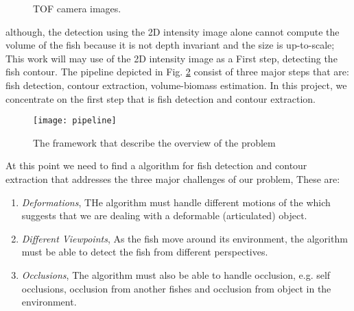 \begin{figure}[h]
\centering
{}

%
\caption{TOF camera images.}
\label{fig:tofNoisy}
\end{figure}

although, the detection using the 2D intensity image alone cannot compute the volume
of the fish because it is not depth invariant and the size is up-to-scale; This work 
will may use of the 2D intensity image as a First step, detecting the fish contour.
The pipeline depicted in Fig. \ref{fig:pipeline} consist of three major steps
that are: fish detection, contour extraction, volume-biomass estimation. In this 
project, we concentrate on the first step that is fish detection and contour extraction.

\begin{figure}[h]
\centering
\texttt{[image: pipeline]}
\caption{The framework that describe the overview of the problem}
\label{fig:pipeline}
\end{figure}

At this point we need to find a algorithm for fish detection and contour extraction 
that addresses the three major challenges of our problem, These are:

\begin{enumerate}
\item \textit{Deformations}, THe algorithm must handle different motions of the
which suggests that we are dealing with a deformable (articulated) object.
\item \textit{Different Viewpoints}, As the fish move around its environment, the 
algorithm must be able to detect the fish from different perspectives.
\item \textit{Occlusions}, The algorithm must also be able to handle occlusion, 
e.g. self occlusions, occlusion from another fishes and occlusion from object in 
the environment.
\end{enumerate}

